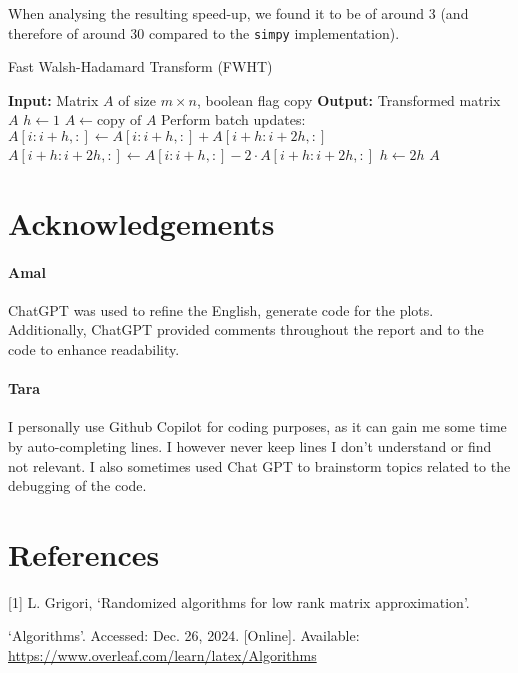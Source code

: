 \documentclass[a4paper, 12pt,oneside]{article}
\begin{document}
	When analysing the resulting speed-up, we found it to be of around 3 (and therefore of around 30 compared to the \texttt{simpy} implementation). 
	\begin{algorithm}
		\caption{Fast Walsh-Hadamard Transform (FWHT)}
		\begin{algorithmic}[1]
			\State \textbf{Input:} Matrix $A$ of size $m \times n$, boolean flag $\text{copy}$
			\State \textbf{Output:} Transformed matrix $A$
			\State $h \gets 1$
				\State $A \gets \text{copy of } A$
			\EndIf
					\State Perform batch updates:
					\Statex \hspace{\algorithmicindent} $A[i:i+h, :] \gets A[i:i+h, :] + A[i+h:i+2h, :]$
					\Statex \hspace{\algorithmicindent} $A[i+h:i+2h, :] \gets A[i:i+h, :] - 2 \cdot A[i+h:i+2h, :]$
				\EndFor
				\State $h \gets 2h$
			\EndWhile
				\State \Return $A$
			\EndIf
		\end{algorithmic}
	\end{algorithm}
	
	
	\section*{Acknowledgements}
		\paragraph{Amal}
		ChatGPT was used to refine the English, generate code for the plots. Additionally, ChatGPT provided comments throughout the report and to the code to enhance readability.
		\paragraph{Tara}
		I personally use Github Copilot for coding purposes, as it can gain me some time by auto-completing lines. I however never keep lines I don't understand or find not relevant. I also sometimes used Chat GPT to brainstorm topics related to the debugging of the code.	
	\section*{References}
	[1] L. Grigori, ‘Randomized algorithms for low rank matrix approximation’.

	\noindent
	[2] ‘Algorithms’. Accessed: Dec. 26, 2024. [Online]. Available: \url{https://www.overleaf.com/learn/latex/Algorithms}
\end{document}
